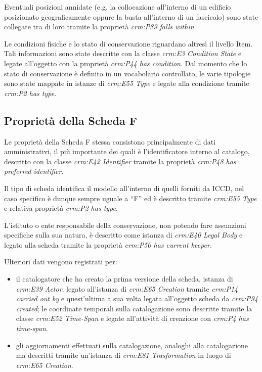Eventuali posizioni annidate (e.g. la collocazione all'interno di un edificio posizionato geograficamente oppure la busta all'interno di un fascicolo) sono state collegate tra di loro tramite la proprietà \emph{crm:P89 falls within}.

Le condizioni fisiche e lo stato di conservazione riguardano altresì il livello Item. Tali informazioni sono state descritte con la classe \emph{crm:E3 Condition State} e legate all'oggetto con la proprietà \emph{crm:P44 has condition}. Dal momento che lo stato di conservazione è definito in un vocabolario controllato, le varie tipologie sono state mappate in istanze di \emph{crm:E55 Type} e legate alla condizione tramite \emph{crm:P2 has type}.

\subsection{Proprietà della Scheda F}

Le proprietà della Scheda F stessa consistono principalmente di dati amministrativi, il più importante dei quali è l'identificatore interno al catalogo, descritto con la classe \emph{crm:E42 Identifier} tramite la proprietà \emph{crm:P48 has preferred identifier}.

Il tipo di scheda identifica il modello all'interno di quelli forniti da ICCD, nel caso specifico è dunque sempre uguale a ``F'' ed è descritto tramite \emph{crm:E55 Type} e relativa proprietà \emph{crm:P2 has type}.

L'istituto o ente responsabile della conservazione, non potendo fare assunzioni specifiche sulla sua natura, è descritto come istanza di \emph{crm:E40 Legal Body} e legato alla scheda tramite la proprietà \emph{crm:P50 has current keeper}.

Ulteriori dati vengono registrati per:
\begin{itemize}
\item il catalogatore che ha creato la prima versione della scheda, istanza di \emph{crm:E39 Actor}, legato all'istanza di \emph{crm:E65 Creation} tramite \emph{crm:P14 carried out by} e quest'ultima a sua volta legata all'oggetto scheda da \emph{crm:P94 created}; le coordinate temporali sulla catalogazione sono descritte tramite la classe \emph{crm:E52 Time-Span} e legate all'attività di creazione con \emph{crm:P4 has time-span}.
\item gli aggiornamenti effettuati sulla catalogazione, analoghi alla catalogazione ma descritti tramite un'istanza di \emph{crm:E81 Trasformation} in luogo di \emph{crm:E65 Creation}.
\end{itemize}
